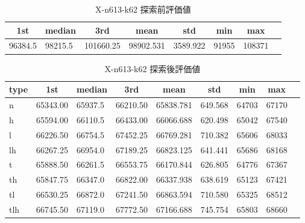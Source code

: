 \begin{table}[htbp]
    \centering
    \caption{X-n613-k62 探索前評価値}
    \begin{tabular}{|l|l|l|l|l|l|l|l|}\hline
    \multicolumn{1}{|c|}{\textbf{1st}}
    &\multicolumn{1}{c|}{\textbf{median}}
    &\multicolumn{1}{c|}{\textbf{3rd}}
    &\multicolumn{1}{c|}{\textbf{mean}}
    &\multicolumn{1}{c|}{\textbf{std}}
    &\multicolumn{1}{c|}{\textbf{min}}
    &\multicolumn{1}{c|}{\textbf{max}}\\\hline
	96384.5 & 98215.5 & 101660.25 & 98902.531 & 3589.922 & 91955 & 108371\\\hline
	\end{tabular}
\end{table}
\begin{table}[htbp]
    \centering
    \caption{X-n613-k62 探索後評価値}
    \begin{tabular}{|l|l|l|l|l|l|l|l|l|}\hline
    \multicolumn{1}{|c|}{\textbf{type}}
    &\multicolumn{1}{|c|}{\textbf{1st}}
    &\multicolumn{1}{c|}{\textbf{median}}
    &\multicolumn{1}{c|}{\textbf{3rd}}
    &\multicolumn{1}{c|}{\textbf{mean}}
    &\multicolumn{1}{c|}{\textbf{std}}
    &\multicolumn{1}{c|}{\textbf{min}}
    &\multicolumn{1}{c|}{\textbf{max}}\\\hline
	n & 65343.00 & 65937.5 & 66210.50 & 65838.781 & 649.568 & 64703 & 67170\\\hline
	h & 65594.00 & 66110.5 & 66433.00 & 66066.688 & 620.498 & 65042 & 67540\\\hline
	l & 66226.50 & 66754.5 & 67452.25 & 66769.281 & 710.382 & 65606 & 68033\\\hline
	lh & 66267.25 & 66954.0 & 67189.25 & 66823.125 & 641.441 & 65686 & 68168\\\hline
	t & 65888.50 & 66261.5 & 66553.75 & 66170.844 & 626.805 & 64776 & 67367\\\hline
	th & 65847.75 & 66347.0 & 66822.00 & 66337.938 & 638.619 & 65123 & 67421\\\hline
	tl & 66530.25 & 66872.0 & 67241.50 & 66863.594 & 710.580 & 65325 & 68512\\\hline
	tlh & 66745.50 & 67119.0 & 67772.50 & 67166.688 & 745.754 & 65803 & 68660\\\hline
	\end{tabular}
\end{table}
